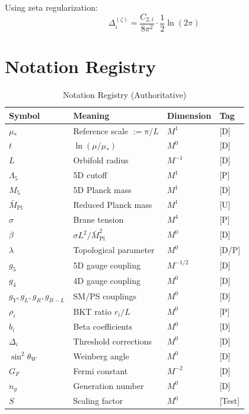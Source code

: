 \documentclass[11pt,a4paper]{article}
\theoremstyle{definition}
\begin{document}
Using zeta regularization:
\begin{equation}
\label{eq:Delta_zeta}
\Delta_i^{(\zeta)} = \frac{C_{2,i}}{8\pi^2} \cdot \frac{1}{2}\ln(2\pi)
\end{equation}

\section{Notation Registry}
\label{sec:notation}

\begin{table}[h]
\centering
\caption{Notation Registry (Authoritative)}
\label{tab:notation_registry}
\begin{tabular}{@{}llll@{}}
\toprule
\textbf{Symbol} & \textbf{Meaning} & \textbf{Dimension} & \textbf{Tag} \\
\midrule
$\mu_*$ & Reference scale $:= \pi/L$ & $M^1$ & [D] \\
$t$ & $\ln(\mu/\mu_*)$ & $M^0$ & [D] \\
$L$ & Orbifold radius & $M^{-1}$ & [D] \\
$\Lambda_5$ & 5D cutoff & $M^1$ & [P] \\
$M_5$ & 5D Planck mass & $M^1$ & [D] \\
$\bar{M}_{\text{Pl}}$ & Reduced Planck mass & $M^1$ & [U] \\
$\sigma$ & Brane tension & $M^4$ & [P] \\
$\beta$ & $\sigma L^2/\bar{M}_{\text{Pl}}^2$ & $M^0$ & [D] \\
$\lambda$ & Topological parameter & $M^0$ & [D/P] \\
$g_5$ & 5D gauge coupling & $M^{-1/2}$ & [D] \\
$g_4$ & 4D gauge coupling & $M^0$ & [D] \\
$g_Y, g_L, g_R, g_{B-L}$ & SM/PS couplings & $M^0$ & [D] \\
$\rho_i$ & BKT ratio $r_i/L$ & $M^0$ & [P] \\
$b_i$ & Beta coefficients & $M^0$ & [D] \\
$\Delta_i$ & Threshold corrections & $M^0$ & [D] \\
$\sin^2\theta_W$ & Weinberg angle & $M^0$ & [D] \\
$G_F$ & Fermi constant & $M^{-2}$ & [D] \\
$n_g$ & Generation number & $M^0$ & [D] \\
$S$ & Scaling factor & $M^0$ & [Test] \\
\bottomrule
\end{tabular}
\end{table}
\end{document}

